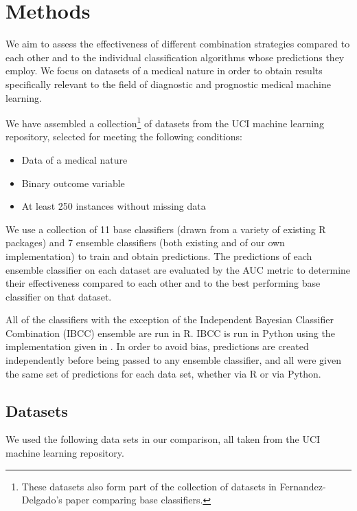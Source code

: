 \documentclass{document}
\begin{document}
\section{Methods}

 We aim to assess the effectiveness of different combination strategies compared to each other and to the individual classification algorithms whose predictions they employ.  We focus on datasets of a medical nature in order to obtain results specifically relevant to the field of diagnostic and prognostic medical machine learning.

We have assembled a collection\footnote{These datasets also form part of the collection of datasets in Fernandez-Delgado's paper \cite{classifiercomparison} comparing base classifiers.} of datasets from the UCI machine learning repository, selected for meeting the following conditions:

\begin{itemize}
\item Data of a medical nature
\item Binary  outcome variable
\item At least 250 instances without missing data
\end{itemize}

\noindent
We use a collection of 11 base classifiers (drawn from a variety of existing R packages) and 7 ensemble classifiers (both existing and of our own implementation) to train and obtain predictions. The predictions of each ensemble classifier on each dataset are evaluated by the AUC metric to determine their effectiveness compared to each other and to the best performing base classifier on that dataset.

All of the classifiers with the exception of the Independent Bayesian Classifier Combination (IBCC) ensemble are run in R. IBCC is run in Python using the implementation given in \cite{Simpson13}. In order to avoid bias, predictions are created independently before being passed to any ensemble classifier, and all were given the same set of predictions for each data set, whether via R or via Python.


\subsection{Datasets}

We  used the following data sets in our comparison, all taken from the UCI machine learning repository\cite{UCIrep}.
\end{document}
